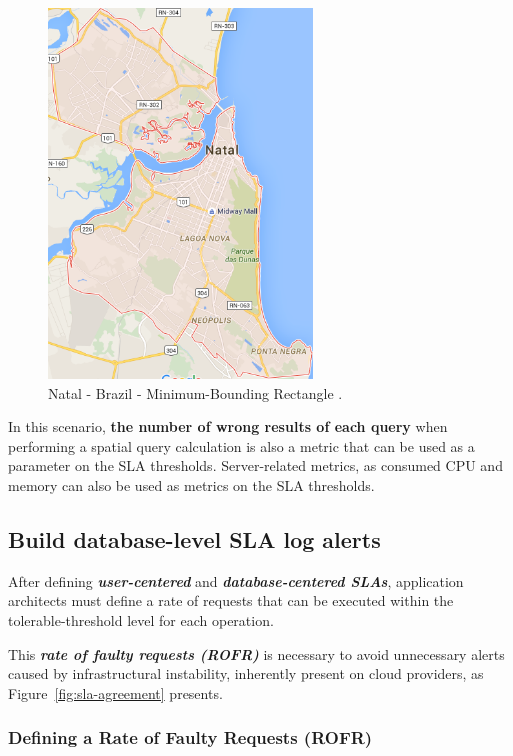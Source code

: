 \begin{figure}[ht!]
\centering
\includegraphics[width=70mm]{Imagens/natal.png}
\caption{Natal - Brazil - Minimum-Bounding Rectangle \cite{gmapsnatal}.~\label{fig:natalmbr}}
\end{figure}

In this scenario, \textbf{the number of wrong results of each query} when performing a spatial query calculation is also a metric that can be used as a parameter on the SLA thresholds. Server-related metrics, as consumed CPU and memory can also be used as metrics on the SLA thresholds.



\subsection{Build database-level SLA log alerts}

After defining \textbf{\textit{user-centered}} and \textbf{\textit{database-centered SLAs}}, application architects must define a rate of requests that can be executed within the tolerable-threshold level for each operation.

This \textbf{\textit{rate of faulty requests (ROFR)}} is necessary to avoid unnecessary alerts caused by infrastructural instability, inherently present on cloud providers, as Figure~\ref{fig:sla-agreement} presents.

\subsubsection{Defining a Rate of Faulty Requests (ROFR)}


